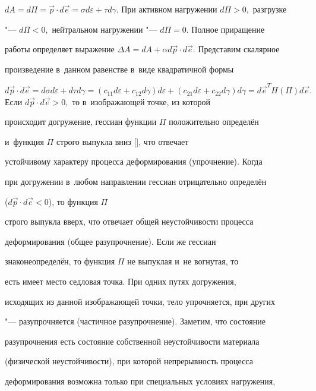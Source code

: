 $dA=d\Pi=\overrightarrow{p}\cdot d\overrightarrow{e}=\sigma d

\varepsilon+\tau d\gamma.$ При активном нагружении $d\Pi>0,$ разгрузке

"--- $d\Pi<0,$ нейтральном нагружении "--- $d\Pi=0.$ Полное приращение

работы определяет выражение $\Delta A=dA+\alpha d\overrightarrow{p}\cdot d\overrightarrow{e}.$ Представим скалярное

произведение в~данном равенстве в~виде квадратичной формы

$d\overrightarrow{p}\cdot d\overrightarrow{e}=d\sigma

d\varepsilon+d\tau d\gamma=(c_{11}d

\varepsilon+c_{12}d\gamma)d\varepsilon+(c_{21}d

\varepsilon+c_{22}d\gamma)d\gamma=d\overrightarrow{e}^T

H(\Pi)d\overrightarrow{e}.$ Если $d\overrightarrow{p}\cdot

d\overrightarrow{e}>0,$ то в~изображающей точке, из которой

происходит догружение, гессиан функции $\Pi$ положительно определён

и~функция $\Pi$ строго выпукла вниз [{}], что отвечает

устойчивому характеру процесса деформирования (упрочнение). Когда

при догружении в~любом направлении гессиан отрицательно определён

($d\overrightarrow{p}\cdot d\overrightarrow{e}<0$), то функция $\Pi$

строго выпукла вверх, что отвечает общей неустойчивости процесса

деформирования (общее разупрочнение). Если же гессиан

знаконеопределён, то функция $\Pi$ не выпуклая и~не вогнутая, то

есть имеет место седловая точка. При одних путях догружения,

исходящих из данной изображающей точки, тело упрочняется, при других

"--- разупрочняется (частичное разупрочнение). Заметим, что состояние

разупрочнения есть состояние собственной неустойчивости материала

(физической неустойчивости), при которой непрерывность процесса

деформирования возможна только при специальных условиях нагружения,


